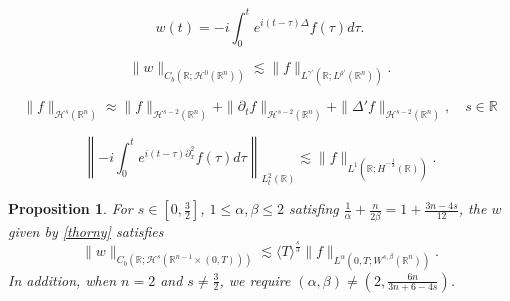 \documentclass[10pt,a4paper]{amsart}
\newtheorem{proposition}{Proposition}
\begin{document}
\begin{equation}\label{thorny}
	w(t)=-i\int_{0}^{t}e^{i(t-\tau)\Delta}f(\tau)d\tau.
\end{equation}

	\begin{equation}\label{cope}	
		\|w\|_{C_{b}(\mathbb{R};\mathcal{H}^{0}(\mathbb{R}^{n}))}\lesssim \|f\|_{L^{\gamma'}(\mathbb{R};L^{\rho'}(\mathbb{R}^{n}))}.
	\end{equation}

\begin{equation}\label{shenjing}			\|f\|_{\mathcal{H}^{s}(\mathbb{R}^{n})}\approx\|f\|_{\mathcal{H}^{s-2}(\mathbb{R}^{n})}+\|\partial_{t}f\|_{\mathcal{H}^{s-2}(\mathbb{R}^{n})}+\|\Delta'f\|_{\mathcal{H}^{s-2}(\mathbb{R}^{n})},\quad s\in \mathbb{R}
\end{equation}

\begin{equation}\label{faction}
	\left\|-i\int_{0}^{t} e^{i(t-\tau)\partial_{x}^{2}}f(\tau)d\tau\right\|_{L_{t}^{2}(\mathbb{R})}\lesssim\|f\|_{L^{1}(\mathbb{R};\dot{H}^{-\frac{1}{2}}(\mathbb{R}))}.
\end{equation}	

\begin{proposition}\label{p33}
	For $s\in\left[0,\frac{3}{2}\right]$, $1\leq \alpha,\beta\leq 2$ satisfing $\frac{1}{\alpha}+\frac{n}{2\beta}=1+\frac{3n-4s}{12}$,  the $w$ given by \eqref{thorny} satisfies
	\begin{equation}\label{taowuji}
		\|w\|_{C_{b}(\mathbb{R};\mathcal{H}^{s}(\mathbb{R}^{n-1}\times(0,T)))}\lesssim\langle T\rangle^{\frac{s}{3}}\|f\|_{L^{\alpha}(0,T;W^{s,\beta}(\mathbb{R}^{n}))}.
	\end{equation}
	In addition, when  $n=2$ and $s\neq\frac{3}{2}$, we require $\left(\alpha,\beta\right)\neq \left(2,\frac{6n}{3n+6-4s}\right)$.
\end{proposition}
\end{document}

